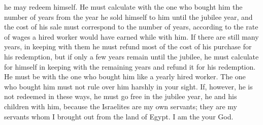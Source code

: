 {he may redeem
himself.
He
must calculate
with
the one who bought
him the number of years
from the year he sold
himself to him until
the jubilee
year,
and the cost
of his sale
must correspond to the number
of years,
according to the rate
of wages a hired worker
would have earned while with him.
If
there are still
many
years,
in keeping
with them he must refund
most of the cost
of his purchase
for his redemption,
but if
only a few
years
remain
until
the jubilee,
he must calculate
for himself in keeping with the remaining
years
and refund
it for his redemption.
He must be
with
the one who bought him like a yearly
hired worker.
The one who bought him must not
rule
over him harshly
in your sight.
If,
however, he is not
redeemed
in these
ways, he must go free
in the jubilee
year,
he and his children
with him,
because
the Israelites
are my own servants;
they are
my servants
whom
I brought out
from the land
of Egypt.
I am
the {}
your God.

}
